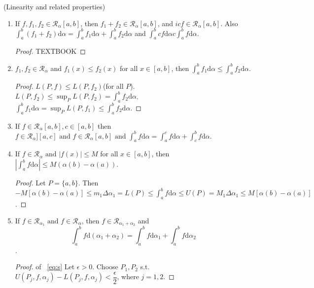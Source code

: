 \begin{thm}[12](Linearity and related properties)
	\begin{enumerate}
		\item If $f,f_1,f_2 \in \mathscr{R}_{\alpha}[a,b]$, then $f_1+f_2 \in \mathscr{R}_{\alpha}[a,b]$, and $icf \in \mathscr{R}_{\alpha}[a,b]$. Also $\int_{a}^{b}{(f_1+f_2)\mathrm{d}\alpha}=\int_{a}^{b}{f_1\mathrm{d}\alpha}+\int_{a}^{b}{f_2\mathrm{d}\alpha}$ and $\int_{a}^{b}{c f\mathrm{d}\alpha}c \int_{a}^{b}{f\mathrm{d}\alpha}$.
		      \begin{proof}
			      TEXTBOOK
		      \end{proof}
		\item $f_1,f_2 \in \mathscr{R}_{\alpha}$ and $f_1(x)\le f_2(x)$ for all $x \in [a,b]$, then $\int_{a}^{b}{f_1\mathrm{d}\alpha}\le \int_{a}^{b}{f_2\mathrm{d}\alpha}$.
		      \begin{proof}
			      $L(P,f)\le L(P,f_2)$(for all $P$).
			      $L(P,f_2)\le \sup_P L(P,f_2)=\int_{a}^{b}{f_2\mathrm{d}\alpha}$.
			      $\int_{a}^{b}{f_1\mathrm{d}\alpha}=\sup_{P}L(P,f_1)\le  \int_{a}^{b}{f_2\mathrm{d}\alpha}$.
		      \end{proof}
		\item If $f \in \mathscr{R}_{\alpha}[a,b], c \in [a,b]$ then $f \in \mathscr{R}_{\alpha}][a,c] \text{ and } f \in \mathscr{R}_{\alpha}[a,b] \text{ and }  \int_{a}^{b}{f\mathrm{d}\alpha}=\int_{a}^{c}{f\mathrm{d}\alpha}+\int_{c}^{b}{f\mathrm{d}\alpha}$.
		\item If $f \in \mathscr{R}_{\alpha} \text{ and }  |f(x)|\le M$ for all $x \in [a,b]$, then $|\int_{a}^{b}{f\mathrm{d}\alpha}|\le M(\alpha(b)-\alpha(a))$.
		      \begin{proof}
			      Let $P=\{a,b\}$. Then $-M[\alpha(b)-\alpha(a)]\le m_1 \Delta \alpha_1=L(P)\le \int_{a}^{b}{f\mathrm{d}\alpha}\le U(P)=M_1 \Delta \alpha_1\le M [\alpha(b)-\alpha(a)]$.
		      \end{proof}
		\item If $f \in \mathscr{R}_{\alpha_1} \text{ and }  f \in \mathscr{R}_{\alpha}$, then $f \in \mathscr{R}_{\alpha_1+\alpha_2}$ and
		      \begin{equation*}
			      \label{eq:s}
			      \int_{a}^{b}{f\mathrm{d}(\alpha_1+\alpha_2)}=\int_{a}^{b}{f\mathrm{d}\alpha_1}+\int_{a}^{b}{f\mathrm{d}\alpha_2} \tag{*}
		      \end{equation*}.
		      \begin{proof} of ~\ref{eq:s}
			      Let $\epsilon>0$. Choose $P_1,P_2$ s.t. $U(P_{j},f,\alpha_j)-L(P_{j},f,\alpha_j)<\dfrac{\epsilon}{2}$, where $j=1,2$.

\end{proof}
\end{enumerate}
\end{thm}
